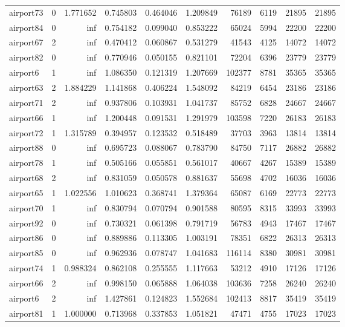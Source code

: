 \begin{longtable}{|l|r|r|r|r|r|r|r|r|r|}
airport73 & 0 & 1.771652 & 0.745803 & 0.464046 & 1.209849 & 76189 & 6119 & 21895 & 21895 \\
airport84 & 0 & inf & 0.754182 & 0.099040 & 0.853222 & 65024 & 5994 & 22200 & 22200 \\
airport67 & 2 & inf & 0.470412 & 0.060867 & 0.531279 & 41543 & 4125 & 14072 & 14072 \\
airport82 & 0 & inf & 0.770946 & 0.050155 & 0.821101 & 72204 & 6396 & 23779 & 23779 \\
airport6 & 1 & inf & 1.086350 & 0.121319 & 1.207669 & 102377 & 8781 & 35365 & 35365 \\
airport63 & 2 & 1.884229 & 1.141868 & 0.406224 & 1.548092 & 84219 & 6454 & 23186 & 23186 \\
airport71 & 2 & inf & 0.937806 & 0.103931 & 1.041737 & 85752 & 6828 & 24667 & 24667 \\
airport66 & 1 & inf & 1.200448 & 0.091531 & 1.291979 & 103598 & 7220 & 26183 & 26183 \\
airport72 & 1 & 1.315789 & 0.394957 & 0.123532 & 0.518489 & 37703 & 3963 & 13814 & 13814 \\
airport88 & 0 & inf & 0.695723 & 0.088067 & 0.783790 & 84750 & 7117 & 26882 & 26882 \\
airport78 & 1 & inf & 0.505166 & 0.055851 & 0.561017 & 40667 & 4267 & 15389 & 15389 \\
airport68 & 2 & inf & 0.831059 & 0.050578 & 0.881637 & 55698 & 4702 & 16036 & 16036 \\
airport65 & 1 & 1.022556 & 1.010623 & 0.368741 & 1.379364 & 65087 & 6169 & 22773 & 22773 \\
airport70 & 1 & inf & 0.830794 & 0.070794 & 0.901588 & 80595 & 8315 & 33993 & 33993 \\
airport92 & 0 & inf & 0.730321 & 0.061398 & 0.791719 & 56783 & 4943 & 17467 & 17467 \\
airport86 & 0 & inf & 0.889886 & 0.113305 & 1.003191 & 78351 & 6822 & 26313 & 26313 \\
airport85 & 0 & inf & 0.962936 & 0.078747 & 1.041683 & 116114 & 8380 & 30981 & 30981 \\
airport74 & 1 & 0.988324 & 0.862108 & 0.255555 & 1.117663 & 53212 & 4910 & 17126 & 17126 \\
airport66 & 2 & inf & 0.998150 & 0.065888 & 1.064038 & 103636 & 7258 & 26240 & 26240 \\
airport6 & 2 & inf & 1.427861 & 0.124823 & 1.552684 & 102413 & 8817 & 35419 & 35419 \\
airport81 & 1 & 1.000000 & 0.713968 & 0.337853 & 1.051821 & 47471 & 4755 & 17023 & 17023 \\

\end{longtable}
